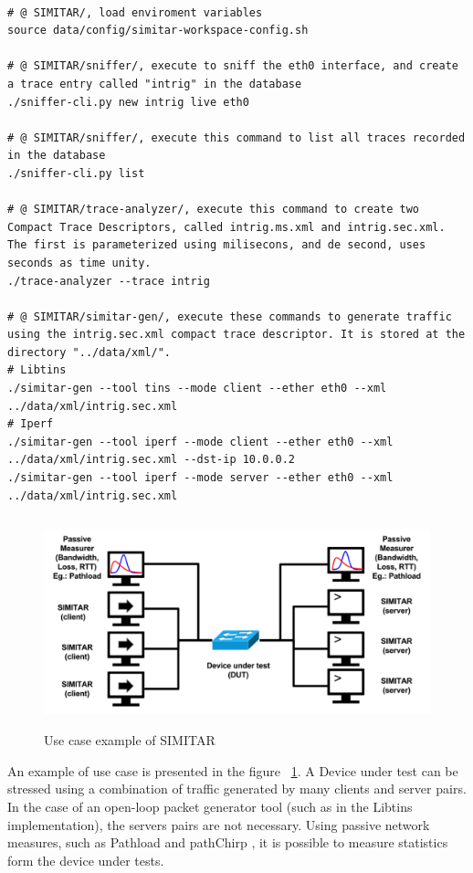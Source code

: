 \begin{verbatim}

# @ SIMITAR/, load enviroment variables
source data/config/simitar-workspace-config.sh

# @ SIMITAR/sniffer/, execute to sniff the eth0 interface, and create a trace entry called "intrig" in the database
./sniffer-cli.py new intrig live eth0

# @ SIMITAR/sniffer/, execute this command to list all traces recorded in the database
./sniffer-cli.py list

# @ SIMITAR/trace-analyzer/, execute this command to create two Compact Trace Descriptors, called intrig.ms.xml and intrig.sec.xml. The first is parameterized using milisecons, and de second, uses seconds as time unity.
./trace-analyzer --trace intrig

# @ SIMITAR/simitar-gen/, execute these commands to generate traffic using the intrig.sec.xml compact trace descriptor. It is stored at the directory "../data/xml/". 
# Libtins
./simitar-gen --tool tins --mode client --ether eth0 --xml ../data/xml/intrig.sec.xml 
# Iperf
./simitar-gen --tool iperf --mode client --ether eth0 --xml ../data/xml/intrig.sec.xml --dst-ip 10.0.0.2
./simitar-gen --tool iperf --mode server --ether eth0 --xml ../data/xml/intrig.sec.xml

\end{verbatim}


\begin{figure}[ht!]
	\centering
	\includegraphics[height=2.4in]{figures/ch3/use-case}
	\caption{Use case example of SIMITAR}
	\label{fig:use-case}
\end{figure}


An example of use case is presented in the figure ~\ref{fig:use-case}. A Device under test can be stressed using a combination of traffic generated by many clients and server pairs. In the case of an open-loop packet generator tool (such as in the Libtins implementation), the servers pairs are not necessary. Using passive network measures, such as Pathload and pathChirp \cite{swing-paper}, it is possible to measure statistics form the device under tests. 



